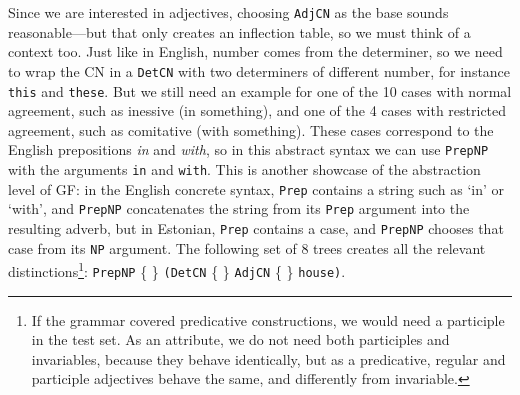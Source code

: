 \documentclass[11pt]{article}
\def\t#1{\texttt{#1}}
\begin{document}
\noindent Since we are interested in adjectives, choosing \t{AdjCN} as
the base sounds reasonable---but that only creates an inflection
table, so we must think of a context too. Just like in English, number
comes from the determiner, so we need to wrap the CN in a \t{DetCN}
with two determiners of different number, for instance \t{this} and
\t{these}. But we still need an example for one of the 10 cases with
normal agreement, such as inessive (in something), and one of the 4
cases with restricted agreement, such as comitative (with something).
These cases correspond to the English prepositions \emph{in} and \emph{with},
so in this abstract syntax we can use \t{PrepNP} with the arguments
\t{in} and \t{with}. This is another showcase of the abstraction level
of GF: in the English concrete syntax, \t{Prep} contains a string
such as `in' or `with', and \t{PrepNP} concatenates the string from its
\t{Prep} argument into the resulting adverb, but in Estonian, \t{Prep}
contains a case, and \t{PrepNP} chooses that case from its \t{NP} argument.
The following set of 8 trees creates all the relevant
distinctions\footnote{If the grammar covered predicative
constructions, we would need a participle in the test set. As an
attribute, we do not need both participles and invariables,
because they behave identically, but as a predicative, regular and
participle adjectives behave the same, and differently from
invariable.}: 
 \t{PrepNP} \{  \}
             {\tt (DetCN} \{  \} 
             {\tt AdjCN}  \{ \} 
             {\tt house)}.

\end{document}
